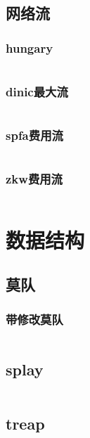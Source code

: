 \documentclass{article}
\begin{document}
\subsection{网络流}
\subsubsection{hungary} %
\inputminted[breaklines]{c++}{../图论/hungary.cpp} %

\subsubsection{dinic最大流}
\inputminted[breaklines]{c++}{../图论/dinic最大流.cpp}

\subsubsection{spfa费用流} %
\inputminted[breaklines]{c++}{../图论/spfa费用流.cpp} %

\subsubsection{zkw费用流} %
\inputminted[breaklines]{c++}{../图论/zkw费用流.cpp} %

\newpage
\section{数据结构}
\subsection{莫队}
\subsubsection{带修改莫队}
\inputminted[breaklines]{c++}{../数据结构/带修改莫队.cpp}

\subsection{splay}
\inputminted[breaklines]{c++}{../数据结构/splay.cpp}

\subsection{treap}
\inputminted[breaklines]{c++}{../数据结构/treap.cpp}
\end{document}
